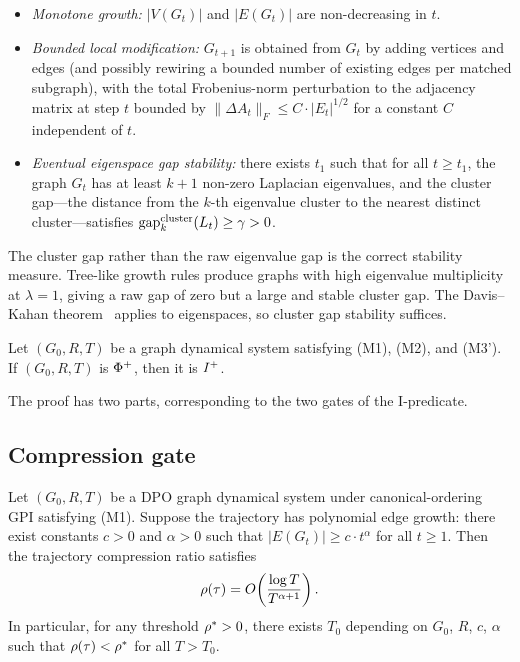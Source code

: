 \documentclass{../shared/primo}
\begin{document}
\begin{itemize}
\item[\textbf{(M1)}] \emph{Monotone growth:} $|V(G_t)|$ and $|E(G_t)|$ are non-decreasing in $t$.
\item[\textbf{(M2)}] \emph{Bounded local modification:} $G_{t+1}$ is obtained from $G_t$ by adding vertices and edges (and possibly rewiring a bounded number of existing edges per matched subgraph), with the total Frobenius-norm perturbation to the adjacency matrix at step $t$ bounded by $\|{\Delta A_t}\|_F \leq C \cdot |E_t|^{1/2}$ for a constant $C$ independent of $t$.
\item[\textbf{(M3')}] \emph{Eventual eigenspace gap stability:} there exists $t_1$ such that for all $t \geq t_1$, the graph $G_t$ has at least $k + 1$ non-zero Laplacian eigenvalues, and the cluster gap---the distance from the $k$-th eigenvalue cluster to the nearest distinct cluster---satisfies $\mathrm{gap}_k^{\mathrm{cluster}}(L_t) \geq \gamma > 0$.
\end{itemize}

\begin{remark}[On M3']
The cluster gap rather than the raw eigenvalue gap is the correct stability measure. Tree-like growth rules produce graphs with high eigenvalue multiplicity at $\lambda = 1$, giving a raw gap of zero but a large and stable cluster gap. The Davis--Kahan theorem~\cite{davis1970rotation,wedin1972perturbation} applies to eigenspaces, so cluster gap stability suffices.
\end{remark}

\begin{conjecture}\label{conj:conditional}
Let $(G_0, R, T)$ be a graph dynamical system satisfying \textup{(M1)}, \textup{(M2)}, and \textup{(M3')}. If $(G_0, R, T)$ is $\Phi\textsuperscript{+}$, then it is $I\textsuperscript{+}$.
\end{conjecture}

The proof has two parts, corresponding to the two gates of the I-predicate.

\subsection*{Compression gate}

\begin{proposition}\label{prop:compression}
Let $(G_0, R, T)$ be a DPO graph dynamical system under canonical-ordering GPI satisfying \textup{(M1)}. Suppose the trajectory has polynomial edge growth: there exist constants $c > 0$ and $\alpha > 0$ such that $|E(G_t)| \geq c \cdot t^{\alpha}$ for all $t \geq 1$. Then the trajectory compression ratio satisfies
\[
\rho(\tau) = O\!\left(\frac{\log T}{T^{\alpha+1}}\right).
\]
In particular, for any threshold $\rho^* > 0$, there exists $T_0$ depending on $G_0$, $R$, $c$, $\alpha$ such that $\rho(\tau) < \rho^*$ for all $T > T_0$.
\end{proposition}
\end{document}

